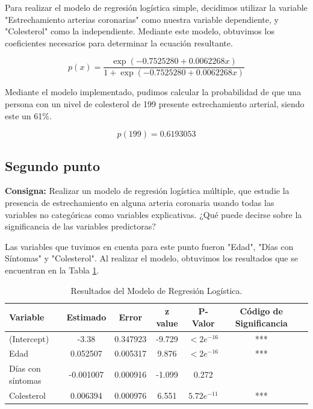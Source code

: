 \documentclass{article} %
\begin{document}
Para realizar el modelo de regresión logística simple, decidimos utilizar la variable "Estrechamiento arterias coronarias" como nuestra variable dependiente, y "Colesterol" como la independiente. Mediante este modelo, obtuvimos los coeficientes necesarios para determinar la ecuación resultante. 

\begin{equation}
p(x)=\frac{\exp(-0.7525280 + 0.0062268x)}{1 + \exp(-0.7525280 + 0.0062268x)}
\end{equation}

Mediante el modelo implementado, pudimos calcular la probabilidad de que una persona con un nivel de colesterol de 199 presente estrechamiento arterial, siendo este un 61\%. 

\begin{equation}
p(199)=0.6193053
\end{equation}

\subsection{Segundo punto}

\textbf{Consigna:} Realizar un modelo de regresión logística múltiple, que estudie la presencia de estrechamiento en alguna arteria coronaria usando todas las variables no categóricas como variables explicativas. ¿Qué puede decirse sobre la significancia de las variables predictoras?

Las variables que tuvimos en cuenta para este punto fueron "Edad", "Días con Síntomas" y "Colesterol". Al realizar el modelo, obtuvimos los resultados que se encuentran en la Tabla \ref{tab:table-punto-2-2}.

\begin{table}[H]
	\centering
		\begin{tabular}{||l || c || c || c || c || c || c ||}
			\hline
			\hline
			Variable & Estimado & Error & z value & P-Valor & Código de Significancia\\
			\hline			
			\hline
			(Intercept) & -3.38 & 0.347923 & -9.729 & $<2e^{-16}$ & ***\\
			\hline
			Edad  & 0.052507 & 0.005317 & 9.876 & $<2e^{-16}$ & ***\\
			\hline
			Días con síntomas & -0.001007 & 0.000916 & -1.099 & 0.272 & \\
			\hline
			Colesterol & 0.006394 & 0.000976 & 6.551 & $5.72e^{-11}$ & ***\\
			\hline
			\hline
		\end{tabular}
		\caption{Resultados del Modelo de Regresión Logística.}
	\label{tab:table-punto-2-2}
\end{table}
\end{document}
